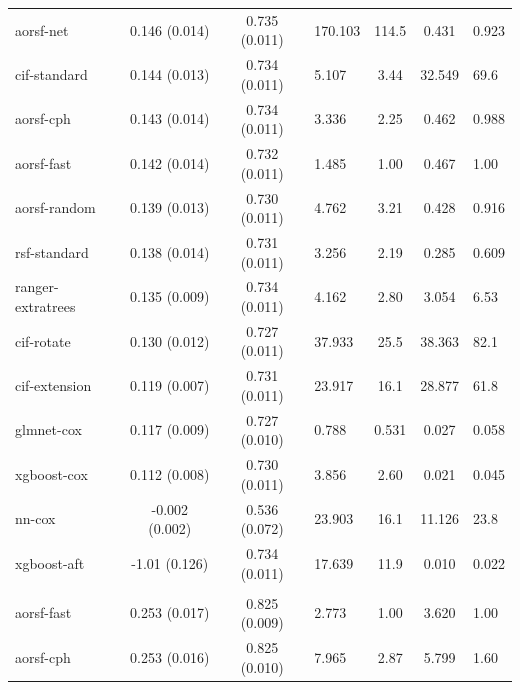 \documentclass[twoside,11pt]{article}\usepackage[]{graphicx}\usepackage[]{xcolor}
\newenvironment{knitrout}{}{} %
\begin{document}
\begin{knitrout}
\begin{longtable}{lcclccl}
\hspace{1em}aorsf-net & 0.146 (0.014) & 0.735 (0.011) & 170.103 & 114.5 & 0.431 & 0.923\\
\hspace{1em}cif-standard & 0.144 (0.013) & 0.734 (0.011) & 5.107 & 3.44 & 32.549 & 69.6\\
\hspace{1em}aorsf-cph & 0.143 (0.014) & 0.734 (0.011) & 3.336 & 2.25 & 0.462 & 0.988\\
\hspace{1em}aorsf-fast & 0.142 (0.014) & 0.732 (0.011) & 1.485 & 1.00 & 0.467 & 1.00\\
\hspace{1em}aorsf-random & 0.139 (0.013) & 0.730 (0.011) & 4.762 & 3.21 & 0.428 & 0.916\\
\hspace{1em}rsf-standard & 0.138 (0.014) & 0.731 (0.011) & 3.256 & 2.19 & 0.285 & 0.609\\
\hspace{1em}ranger-extratrees & 0.135 (0.009) & 0.734 (0.011) & 4.162 & 2.80 & 3.054 & 6.53\\
\hspace{1em}cif-rotate & 0.130 (0.012) & 0.727 (0.011) & 37.933 & 25.5 & 38.363 & 82.1\\
\hspace{1em}cif-extension & 0.119 (0.007) & 0.731 (0.011) & 23.917 & 16.1 & 28.877 & 61.8\\
\hspace{1em}glmnet-cox & 0.117 (0.009) & 0.727 (0.010) & 0.788 & 0.531 & 0.027 & 0.058\\
\hspace{1em}xgboost-cox & 0.112 (0.008) & 0.730 (0.011) & 3.856 & 2.60 & 0.021 & 0.045\\
\hspace{1em}nn-cox & -0.002 (0.002) & 0.536 (0.072) & 23.903 & 16.1 & 11.126 & 23.8\\
\hspace{1em}xgboost-aft & -1.01 (0.126) & 0.734 (0.011) & 17.639 & 11.9 & 0.010 & 0.022\\
\addlinespace[0.3em]
\hline
\multicolumn{7}{l}{\textit{\textbf{Serum free light chain; death, n = 7874, p = 10}}}\\
\hline
\hspace{1em}aorsf-fast & 0.253 (0.017) & 0.825 (0.009) & 2.773 & 1.00 & 3.620 & 1.00\\
\hspace{1em}aorsf-cph & 0.253 (0.016) & 0.825 (0.010) & 7.965 & 2.87 & 5.799 & 1.60\\

\end{longtable}
\end{knitrout}
\end{document}
